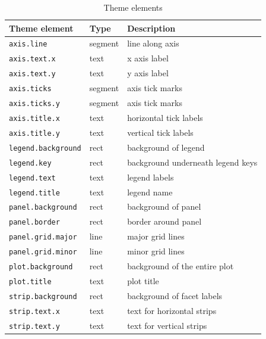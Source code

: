 \begin{table}
  \begin{center}
  \begin{tabular}{lll}\\
    \toprule
    Theme element              & Type     & Description  \\
    \midrule                              
    \texttt{axis.line}         & segment  & line along axis  \\
    \texttt{axis.text.x}       & text     & x axis label  \\
    \texttt{axis.text.y}       & text     & y axis label  \\
    \texttt{axis.ticks}        & segment  & axis tick marks  \\
    \texttt{axis.ticks.y}      & segment  & axis tick marks  \\
    \texttt{axis.title.x}      & text     & horizontal tick labels  \\
    \texttt{axis.title.y}      & text     & vertical tick labels  \\[0.5em]

    \texttt{legend.background} & rect     & background of legend  \\
    \texttt{legend.key}        & rect     & background underneath legend keys \\
    \texttt{legend.text}       & text     & legend labels  \\
    \texttt{legend.title}      & text     & legend name  \\[0.5em]

    \texttt{panel.background}  & rect     & background of panel  \\
    \texttt{panel.border}      & rect     & border around panel  \\
    \texttt{panel.grid.major}  & line     & major grid lines \\
    \texttt{panel.grid.minor}  & line     & minor grid lines \\
    \texttt{plot.background}   & rect     & background of the entire plot \\
    \texttt{plot.title}        & text     & plot title   \\[0.5em]

    \texttt{strip.background}  & rect     & background of facet labels   \\
    \texttt{strip.text.x}      & text     & text for horizontal strips  \\
    \texttt{strip.text.y}      & text     & text for vertical strips  \\
    \bottomrule                           
  
  \end{tabular}
  \end{center}
  \caption{Theme elements}
  \label{tbl:elements}
\end{table}

